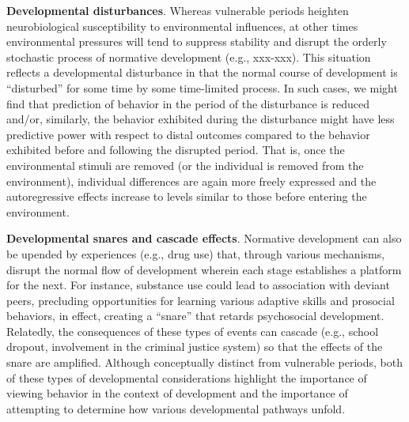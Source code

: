 \documentclass[
  10pt,
  letterpaper,
]{article}
\begin{document}
\textbf{Developmental disturbances}. Whereas vulnerable periods heighten
neurobiological susceptibility to environmental influences, at other
times environmental pressures will tend to suppress stability and
disrupt the orderly stochastic process of normative development (e.g.,
xxx-xxx). This situation reflects a developmental disturbance in that
the normal course of development is ``disturbed'' for some time by some
time-limited process. In such cases, we might find that prediction of
behavior in the period of the disturbance is reduced and/or, similarly,
the behavior exhibited during the disturbance might have less predictive
power with respect to distal outcomes compared to the behavior exhibited
before and following the disrupted period. That is, once the
environmental stimuli are removed (or the individual is removed from the
environment), individual differences are again more freely expressed and
the autoregressive effects increase to levels similar to those before
entering the environment.

\textbf{Developmental snares and cascade effects}. Normative development
can also be upended by experiences (e.g., drug use) that, through
various mechanisms, disrupt the normal flow of development wherein each
stage establishes a platform for the next. For instance, substance use
could lead to association with deviant peers, precluding opportunities
for learning various adaptive skills and prosocial behaviors, in effect,
creating a ``snare'' that retards psychosocial development. Relatedly,
the consequences of these types of events can cascade (e.g., school
dropout, involvement in the criminal justice system) so that the effects
of the snare are amplified. Although conceptually distinct from
vulnerable periods, both of these types of developmental considerations
highlight the importance of viewing behavior in the context of
development and the importance of attempting to determine how various
developmental pathways unfold.
\end{document}
